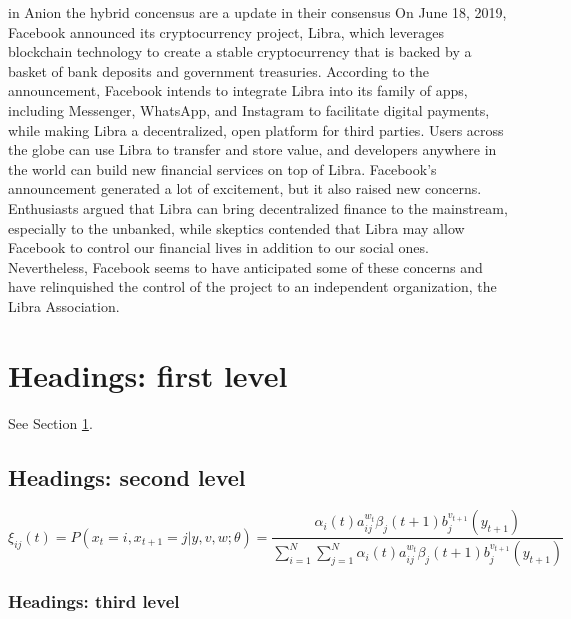 \documentclass{article}
\begin{document}
in Anion the hybrid concensus are a update in their consensus \cite{DBLP:journals/corr/abs-1906-03251}
On June 18, 2019, Facebook announced its cryptocurrency project, Libra, which
leverages blockchain technology to create a stable cryptocurrency that is backed by a basket of
bank deposits and government treasuries. According to the announcement, Facebook intends to
integrate Libra into its family of apps, including Messenger, WhatsApp, and Instagram to
facilitate digital payments, while making Libra a decentralized, open platform for third parties.
Users across the globe can use Libra to transfer and store value, and developers anywhere in the
world can build new financial services on top of Libra. Facebook’s announcement generated a
lot of excitement, but it also raised new concerns. Enthusiasts argued that Libra can bring
decentralized finance to the mainstream, especially to the unbanked, while skeptics contended
that Libra may allow Facebook to control our financial lives in addition to our social ones.
Nevertheless, Facebook seems to have anticipated some of these concerns and have relinquished
the control of the project to an independent organization, the Libra Association.


\section{Headings: first level}
\label{sec:headings}

\lipsum[4] See Section \ref{sec:headings}.

\subsection{Headings: second level}
\lipsum[5]
\begin{equation}
\xi _{ij}(t)=P(x_{t}=i,x_{t+1}=j|y,v,w;\theta)= {\frac {\alpha _{i}(t)a^{w_t}_{ij}\beta _{j}(t+1)b^{v_{t+1}}_{j}(y_{t+1})}{\sum _{i=1}^{N} \sum _{j=1}^{N} \alpha _{i}(t)a^{w_t}_{ij}\beta _{j}(t+1)b^{v_{t+1}}_{j}(y_{t+1})}}
\end{equation}

\subsubsection{Headings: third level}
\lipsum[6]
\end{document}
